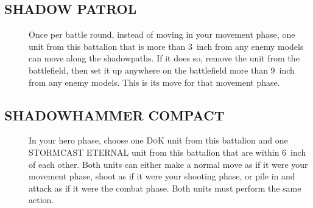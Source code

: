 \subsection{SHADOW PATROL}
\begin{description}
    \item [] Once per battle round, instead of moving in your
  movement phase, one unit from this battalion that is more than 3~inch from
  any enemy models can move along the shadowpaths. If it does so, remove
  the unit from the battlefield, then set it up anywhere on the
  battlefield more than 9~inch from any enemy models. This is its move for
  that movement phase.
\end{description}

\subsection{SHADOWHAMMER COMPACT}
\begin{description}
    \item [] In your hero phase, choose one \textsc{DoK}
  unit from this battalion and one STORMCAST ETERNAL unit from
  this battalion that are within 6~inch of each other. Both units can either
  make a normal move as if it were your movement phase, shoot as if it
  were your shooting phase, or pile in and attack as if it were the
  combat phase. Both units must perform the same action.
\end{description}

\newpage
{}




